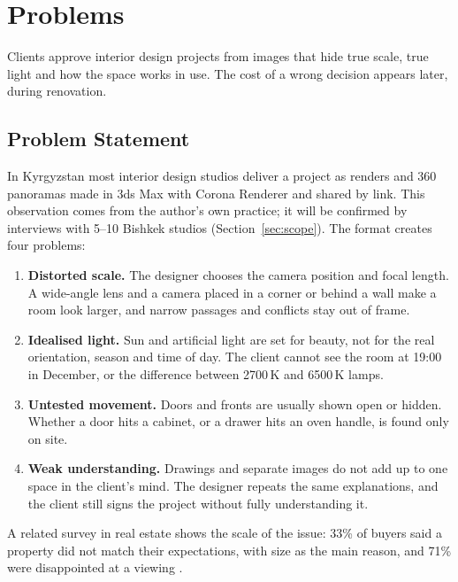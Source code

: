 \chapter{Problems} %
\label{Chapter1}

Clients approve interior design projects from images that hide true scale, true light and how the space works in use. The cost of a wrong decision appears later, during renovation.

\section{Problem Statement}

In Kyrgyzstan most interior design studios deliver a project as renders and 360\textdegree{} panoramas made in 3ds Max with Corona Renderer and shared by link. This observation comes from the author's own practice; it will be confirmed by interviews with 5--10 Bishkek studios (Section~\ref{sec:scope}). The format creates four problems:

\begin{enumerate}
\item \textbf{Distorted scale.} The designer chooses the camera position and focal length. A wide-angle lens and a camera placed in a corner or behind a wall make a room look larger, and narrow passages and conflicts stay out of frame.
\item \textbf{Idealised light.} Sun and artificial light are set for beauty, not for the real orientation, season and time of day. The client cannot see the room at 19:00 in December, or the difference between 2700\,K and 6500\,K lamps.
\item \textbf{Untested movement.} Doors and fronts are usually shown open or hidden. Whether a door hits a cabinet, or a drawer hits an oven handle, is found only on site.
\item \textbf{Weak understanding.} Drawings and separate images do not add up to one space in the client's mind. The designer repeats the same explanations, and the client still signs the project without fully understanding it.
\end{enumerate}

A related survey in real estate shows the scale of the issue: 33\% of buyers said a property did not match their expectations, with size as the main reason, and 71\% were disappointed at a viewing \citep{movestreets2021}.

